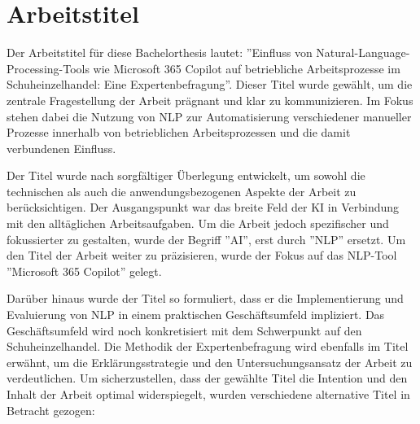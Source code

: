 

\section{Arbeitstitel}

Der Arbeitstitel für diese Bachelorthesis lautet: ''Einfluss von Natural-Language-Processing-Tools wie Microsoft 365 Copilot auf betriebliche Arbeitsprozesse im Schuheinzelhandel: Eine Expertenbefragung''. Dieser Titel wurde gewählt, um die zentrale Fragestellung der Arbeit prägnant und klar zu kommunizieren. Im Fokus stehen dabei die Nutzung von NLP zur Automatisierung verschiedener manueller Prozesse innerhalb von betrieblichen Arbeitsprozessen und die damit verbundenen Einfluss. 

Der Titel wurde nach sorgfältiger Überlegung entwickelt, um sowohl die technischen als auch die anwendungsbezogenen Aspekte der Arbeit zu berücksichtigen. Der Ausgangspunkt war das breite Feld der KI in Verbindung mit den alltäglichen Arbeitsaufgaben. Um die Arbeit jedoch spezifischer und fokussierter zu gestalten, wurde der Begriff ''AI'', erst durch ''NLP'' ersetzt. Um den Titel der Arbeit weiter zu präzisieren, wurde der Fokus auf das NLP-Tool ''Microsoft 365 Copilot'' gelegt. 

Darüber hinaus wurde der Titel so formuliert, dass er die Implementierung und Evaluierung von NLP in einem praktischen Geschäftsumfeld impliziert. Das Geschäftsumfeld wird noch konkretisiert mit dem Schwerpunkt auf den Schuheinzelhandel. Die Methodik der Expertenbefragung wird ebenfalls im Titel erwähnt, um die Erklärungsstrategie und den Untersuchungsansatz der Arbeit zu verdeutlichen. Um sicherzustellen, dass der gewählte Titel die Intention und den Inhalt der Arbeit optimal widerspiegelt, wurden verschiedene alternative Titel in Betracht gezogen:


